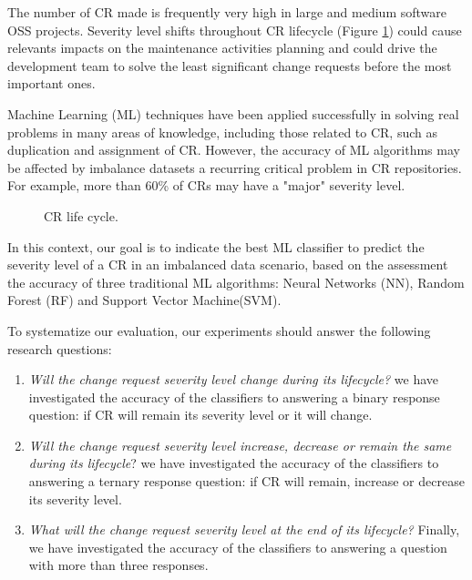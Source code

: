 \documentclass[10pt, conference]{IEEEtran}
\begin{document}
The number of CR made is frequently very high in large and medium software OSS projects\cite{Lamkanfi2011}. Severity level shifts throughout CR lifecycle (Figure \ref{fig:cr-life-cycle}) could cause relevants impacts on the maintenance activities planning and could drive the development team to solve the least significant change requests before the most important ones. 

Machine Learning (ML) techniques have been applied successfully in solving real problems in many areas of knowledge, including those related to CR, such as duplication and assignment of CR\cite{Cavalcanti2014}. However, the accuracy of ML algorithms may be affected by imbalance datasets \cite{Chawla2009} \textemdash a recurring critical problem in CR repositories\cite{Tian2015}. For example, more than 60\% of CRs may have a "major" severity level. 


\begin{figure}[hbt!]  
  \centering
  \caption{CR life cycle\cite{Sommerville2010}.}
  \label{fig:cr-life-cycle}
\end{figure}

In this context, our goal is to indicate the best ML classifier to predict the severity level of a CR in an imbalanced data scenario, based on the assessment the accuracy of three traditional ML algorithms: Neural Networks (NN), Random Forest (RF) and Support Vector Machine(SVM). 

To systematize our evaluation, our experiments should answer the following research questions:

\begin{enumerate}[RQ 1:]
  \item \textit{Will the change request severity level change during its lifecycle?} we have investigated the accuracy of the classifiers to answering a binary response question: if CR will remain its severity level or it will change.
  \item \textit{Will the change request severity level increase, decrease or remain the same during its lifecycle}? we have investigated the accuracy of the classifiers to answering a ternary response question: if CR will remain, increase or decrease its severity level.
  \item \textit{What will the change request severity level at the end of its lifecycle?} Finally, we have investigated the accuracy of the classifiers to answering a question with more than three responses.
\end{enumerate}
\end{document}
